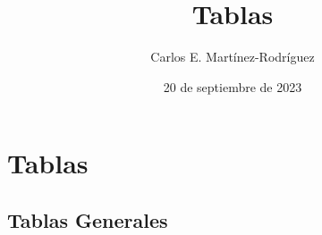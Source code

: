 \documentclass[12pt]{article}
\title{Tablas}
\author{Carlos E. Martínez-Rodríguez}
\date{20 de septiembre de 2023}
\begin{document}
\maketitle

\section{Tablas}

\subsection{Tablas Generales}
\end{document}
